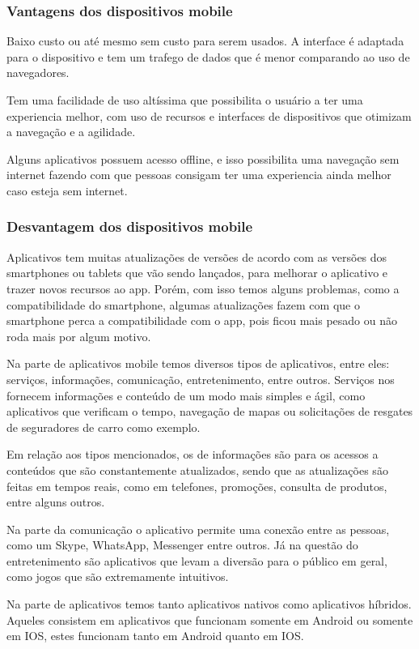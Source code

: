 \subsubsection{Vantagens dos dispositivos mobile}
Baixo custo ou até mesmo sem custo para serem usados. A interface é adaptada para o dispositivo e tem um trafego de dados que é menor comparando ao uso de navegadores.

Tem uma facilidade de uso altíssima que possibilita o usuário a ter uma experiencia melhor, com uso de recursos e interfaces de dispositivos que otimizam a navegação e a agilidade.

Alguns aplicativos possuem acesso offline, e isso possibilita uma navegação sem internet fazendo com que pessoas consigam ter uma experiencia ainda melhor caso esteja sem internet.

\subsubsection{Desvantagem dos dispositivos mobile}
Aplicativos tem muitas atualizações de versões de acordo com as versões dos smartphones ou tablets que vão sendo lançados, para melhorar o aplicativo e trazer novos recursos ao app. Porém, com isso temos alguns problemas, como a compatibilidade do smartphone, algumas atualizações fazem com que o smartphone perca a compatibilidade com o app, pois ficou mais pesado ou não roda mais por algum motivo.

Na parte de aplicativos mobile temos diversos tipos de aplicativos, entre eles: serviços, informações, comunicação, entretenimento, entre outros. Serviços nos fornecem informações e conteúdo de um modo mais simples e ágil, como aplicativos que verificam o tempo, navegação de mapas ou solicitações de resgates de seguradores de carro como exemplo.

Em relação aos tipos mencionados, os de informações são para os acessos a conteúdos que são constantemente atualizados, sendo que as atualizações são feitas em tempos reais, como em telefones, promoções, consulta de produtos, entre alguns outros.

Na parte da comunicação o aplicativo permite uma conexão entre as pessoas, como um Skype, WhatsApp, Messenger entre outros. Já na questão do entretenimento são aplicativos que levam a diversão para o público em geral, como jogos que são extremamente intuitivos.

Na parte de aplicativos temos tanto aplicativos nativos como aplicativos híbridos. Aqueles consistem em aplicativos que funcionam somente em Android ou somente em IOS, estes funcionam tanto em Android quanto em IOS.

